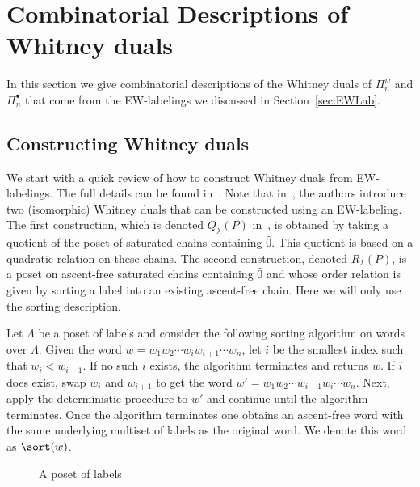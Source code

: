 





  
 
\section{Combinatorial Descriptions of  Whitney duals} \label{sec:CombDescriptOfWhitneyDual}


In this section we give combinatorial descriptions of the Whitney duals of $\Pi_n^w$ and $\Pi_n^\bullet$ that come from the EW-labelings we discussed in Section~\ref{sec:EWLab}.

\subsection{Constructing Whitney duals}\label{sec:constructingWD}
  We start with a quick review of how to construct Whitney duals from EW-labelings. The full details can be found in~\cite{GonzalezHallam2021}. Note that in~\cite{GonzalezHallam2021}, the authors introduce two (isomorphic) Whitney duals that can be constructed using an EW-labeling.  The first construction, which is denoted $Q_{\lambda}(P)$ in~\cite{GonzalezHallam2021}, is obtained by taking a quotient of the poset of saturated chains containing $\hat{0}$. This quotient is based on a quadratic relation on these chains. The second construction, denoted $R_{\lambda}(P)$, is a poset on ascent-free saturated chains containing $\hat{0}$ and whose order relation is given by sorting a label into an existing ascent-free chain.  Here  we will   only use the sorting description.

Let $\Lambda$ be a poset of labels and consider the following sorting algorithm on words over $\Lambda$.  Given the word  $w=w_1w_2\cdots w_iw_{i+1}\cdots w_n$, let $i$ be the smallest index such that  $w_i<w_{i+1}$.  If no such $i$ exists, the algorithm terminates and returns $w$.  If $i$ does exist, swap $w_i$ and $w_{i+1}$ to get the word $w'=w_1w_2\cdots w_{i+1}w_i\cdots w_n$.  Next, apply the deterministic procedure to $w'$ and continue until the algorithm terminates. Once the algorithm terminates one obtains an  ascent-free word with the same underlying multiset of labels as the original word. We denote this  word as $\sort(w)$. 

\begin{figure}
  \caption{A poset of labels}\label{fig:posetOfLabels}
\end{figure}

